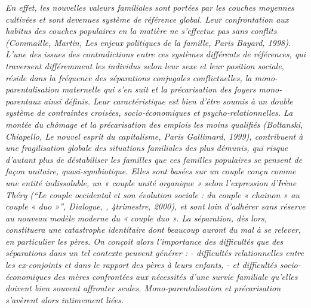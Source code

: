 \begin{displayquote}{\emph{En effet, les nouvelles valeurs familiales sont portées par les couches moyennes cultivées et sont devenues système de référence global. Leur confrontation aux habitus des couches populaires en la matière ne s'effectue pas sans conflits (Commaille, Martin, \emph{Les enjeux politiques de la famille}, Paris Bayard, 1998). L'une des issues des contradictions entre ces systèmes différents de références, qui traversent différemment les individus selon leur sexe et leur position sociale, réside dans la fréquence des séparations conjugales conflictuelles, la mono-parentalisation maternelle qui s'en suit et la précarisation des foyers mono-parentaux ainsi définis. Leur caractéristique est bien d'être soumis à un double système de contraintes croisées, socio-économiques et psycho-relationnelles.
La montée du chômage et la précarisation des emplois les moins qualifiés (Boltanski, Chiapello, \emph{Le nouvel esprit du capitalisme}, Paris Gallimard, 1999), contribuent à une fragilisation globale des situations familiales des plus démunis, qui risque d'autant plus de déstabiliser les familles que ces familles populaires se pensent de façon unitaire, quasi-symbiotique.
Elles sont basées sur un couple conçu comme une entité indissoluble, un « couple unité organique » selon l'expression d'Irène Théry (\enquote{\emph{Le couple occidental et son évolution sociale : du couple « chainon » au couple « duo »}}, Dialogue, , 4\ieme trimestre, 2000), et sont loin d'adhérer sans réserve au nouveau modèle moderne du « couple duo ». La séparation, dès lors, constituera une catastrophe identitaire dont beaucoup auront du mal à se relever, en particulier les pères.
On conçoit alors l'importance des difficultés que des séparations dans un tel contexte peuvent générer :
- difficultés relationnelles entre les ex-conjoints et dans le rapport des pères à leurs enfants,
- et difficultés socio-économiques des mères confrontées aux nécessités d'une survie familiale qu'elles doivent bien souvent affronter seules.
Mono-parentalisation et précarisation s'avèrent alors intimement liées.}}

\end{displayquote}



